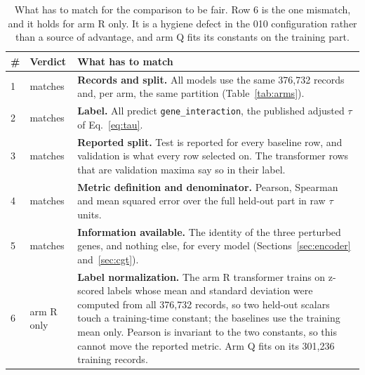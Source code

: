 \begin{table}[htbp]
\centering
\footnotesize
\caption{What has to match for the comparison to be fair. Row 6 is the one
mismatch, and it holds for arm R only. It is a hygiene defect in the 010
configuration rather than a source of advantage, and arm Q fits its constants on
the training part.}
\label{tab:comparability}
\begin{tabular}{llp{}}
\toprule
\# & Verdict & What has to match \\
\midrule
1 & matches & \textbf{Records and split.} All models use the same 376{,}732 records
    and, per arm, the same partition (Table~\ref{tab:arms}). \\
2 & matches & \textbf{Label.} All predict \texttt{gene\_interaction}, the published
    adjusted $\tau$ of Eq.~\ref{eq:tau}. \\
3 & matches & \textbf{Reported split.} Test is reported for every baseline row, and
    validation is what every row selected on. The transformer rows that are
    validation maxima say so in their label. \\
4 & matches & \textbf{Metric definition and denominator.} Pearson, Spearman and
    mean squared error over the full held-out part in raw $\tau$ units. \\
5 & matches & \textbf{Information available.} The identity of the three perturbed
    genes, and nothing else, for every model (Sections~\ref{sec:encoder}
    and~\ref{sec:cgt}). \\
6 & arm R only & \textbf{Label normalization.} The arm R transformer trains on
    z-scored labels whose mean and standard deviation were computed from all
    376{,}732 records, so two held-out scalars touch a training-time constant; the
    baselines use the training mean only. Pearson is invariant to the two
    constants, so this cannot move the reported metric. Arm Q fits on its 301{,}236
    training records. \\
\bottomrule
\end{tabular}
\end{table}

